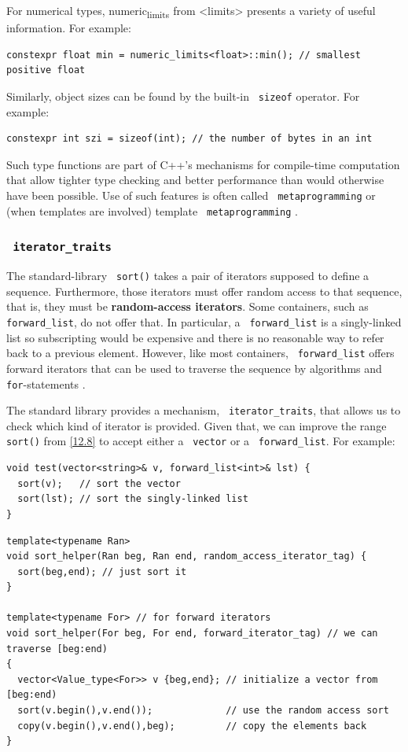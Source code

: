 \documentclass[11pt]{article}
\let\OldTexttt\texttt
\renewcommand{\texttt}[1]{\OldTexttt{\color{MidnightBlue} #1}}
\begin{document}
For numerical types, numeric\textsubscript{limits} from <limits> presents a variety of useful information. For
example:
\begin{verbatim}
constexpr float min = numeric_limits<float>::min(); // smallest positive float
\end{verbatim}
Similarly, object sizes can be found by the built-in \texttt{sizeof} operator. For example:
\begin{verbatim}
constexpr int szi = sizeof(int); // the number of bytes in an int
\end{verbatim}
Such type functions are part of C++'s mechanisms for compile-time computation that allow tighter
type checking and better performance than would otherwise have been possible. Use of such
features is often called \texttt{metaprogramming} or (when templates are involved) template
\texttt{metaprogramming} .
\subsubsection{\texttt{iterator\_traits}}
\label{sec:orgc6e01c4}
The standard-library \texttt{sort()} takes a pair of iterators supposed to define a sequence. Furthermore, those iterators must offer random access to that sequence, that is, they must
be \textbf{random-access iterators}. Some containers, such as \texttt{forward\_list}, do not offer that. In
particular, a \texttt{forward\_list} is a singly-linked list so subscripting would be expensive and
there is no reasonable way to refer back to a previous element. However, like most containers,
\texttt{forward\_list} offers forward iterators that can be used to traverse the sequence by algorithms
and \texttt{for}-statements .

The standard library provides a mechanism, \texttt{iterator\_traits}, that allows us to check which kind
of iterator is provided. Given that, we can improve the range \texttt{sort()} from \ref{12.8} to accept
either a \texttt{vector} or a \texttt{forward\_list}. For example:
\begin{verbatim}
void test(vector<string>& v, forward_list<int>& lst) {
  sort(v);   // sort the vector
  sort(lst); // sort the singly-linked list
}
\end{verbatim}

\begin{verbatim}
template<typename Ran>
void sort_helper(Ran beg, Ran end, random_access_iterator_tag) {
  sort(beg,end); // just sort it
}

template<typename For> // for forward iterators
void sort_helper(For beg, For end, forward_iterator_tag) // we can traverse [beg:end)
{
  vector<Value_type<For>> v {beg,end}; // initialize a vector from [beg:end)
  sort(v.begin(),v.end());             // use the random access sort
  copy(v.begin(),v.end(),beg);         // copy the elements back
}
\end{verbatim}
\end{document}
